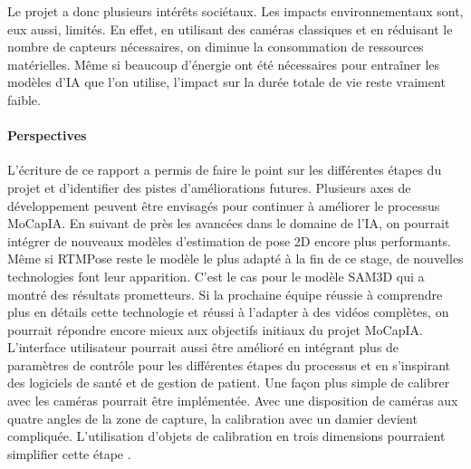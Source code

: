         Le projet a donc plusieurs intérêts sociétaux. Les impacts environnementaux sont, eux aussi, limités. En effet, en utilisant des caméras classiques et en réduisant le nombre de capteurs nécessaires, on diminue la consommation de ressources matérielles. Même si beaucoup d'énergie ont été nécessaires pour entraîner les modèles d'IA que l'on utilise, l'impact sur la durée totale de vie reste vraiment faible.

    \paragraph{Perspectives}

        L'écriture de ce rapport a permis de faire le point sur les différentes étapes du projet et d'identifier des pistes d'améliorations futures. Plusieurs axes de développement peuvent être envisagés pour continuer à améliorer le processus MoCapIA. En suivant de près les avancées dans le domaine de l'IA, on pourrait intégrer de nouveaux modèles d'estimation de pose 2D encore plus performants. Même si RTMPose reste le modèle le plus adapté à la fin de ce stage, de nouvelles technologies font leur apparition. C'est le cas pour le modèle SAM3D qui a montré des résultats prometteurs. Si la prochaine équipe réussie à comprendre plus en détails cette technologie et réussi à l'adapter à des vidéos complètes, on pourrait répondre encore mieux aux objectifs initiaux du projet MoCapIA.
        L'interface utilisateur pourrait aussi être amélioré en intégrant plus de paramètres de contrôle pour les différentes étapes du processus et en s'inspirant des logiciels de santé et de gestion de patient.
        Une façon plus simple de calibrer avec les caméras pourrait être implémentée. Avec une disposition de caméras aux quatre angles de la zone de capture, la calibration avec un damier devient compliquée. L'utilisation d'objets de calibration en trois dimensions pourraient simplifier cette étape \cite{OtherCalibMethods}.